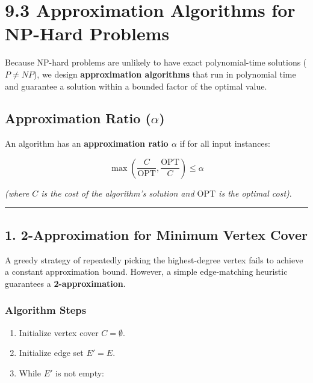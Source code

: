 \documentclass[
]{book}
\providecommand{\tightlist}{%
  \setlength{\itemsep}{0pt}\setlength{\parskip}{0pt}}
\theoremstyle{definition}
\theoremstyle{definition}
\theoremstyle{definition}
\theoremstyle{definition}
\theoremstyle{remark}
\begin{document}
\section{9.3 Approximation Algorithms for NP-Hard Problems}\label{approximation-algorithms-for-np-hard-problems}

Because NP-hard problems are unlikely to have exact polynomial-time solutions (\(P \neq NP\)), we design \textbf{approximation algorithms} that run in polynomial time and guarantee a solution within a bounded factor of the optimal value.

\subsection{\texorpdfstring{Approximation Ratio (\(\alpha\))}{Approximation Ratio (\textbackslash alpha)}}\label{approximation-ratio-alpha}

An algorithm has an \textbf{approximation ratio \(\alpha\)} if for all input instances:

\[\max \left( \frac{C}{\text{OPT}}, \frac{\text{OPT}}{C} \right) \le \alpha\]

\emph{(where \(C\) is the cost of the algorithm's solution and \(\text{OPT}\) is the optimal cost)}.

\begin{center}\rule{0.5\linewidth}{0.5pt}\end{center}

\subsection{1. 2-Approximation for Minimum Vertex Cover}\label{approximation-for-minimum-vertex-cover}

A greedy strategy of repeatedly picking the highest-degree vertex fails to achieve a constant approximation bound. However, a simple edge-matching heuristic guarantees a \textbf{2-approximation}.

\subsubsection{Algorithm Steps}\label{algorithm-steps}

\begin{enumerate}
\def\labelenumi{\arabic{enumi}.}
\tightlist
\item
  Initialize vertex cover \(C = \emptyset\).
\item
  Initialize edge set \(E' = E\).
\item
  While \(E'\) is not empty:
\end{enumerate}
\end{document}
